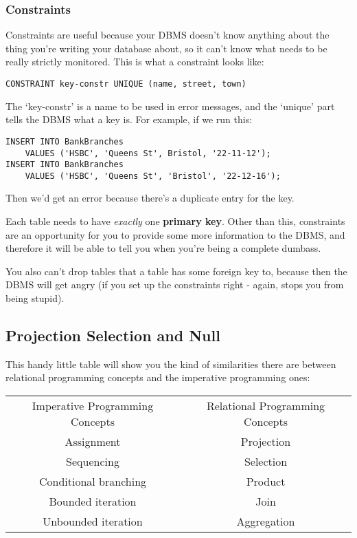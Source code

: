 \documentclass[11pt,a4paper,titlepage,dvipsnames,cmyk]{scrartcl}
\begin{document}
\subsubsection{Constraints}%
\label{ssub:Constraints}
Constraints are useful because your DBMS doesn't know anything about the
thing you're writing your database about, so it can't know what needs to
be really strictly monitored. This is what a constraint looks like:

\begin{lstlisting}[style=B]
CONSTRAINT key-constr UNIQUE (name, street, town)
\end{lstlisting}

The `key-constr' is a name to be used in error messages, and the `unique'
part tells the DBMS what a key is. For example, if we run this:

\begin{lstlisting}[style=B]
INSERT INTO BankBranches
    VALUES ('HSBC', 'Queens St', Bristol, '22-11-12');
INSERT INTO BankBranches
    VALUES ('HSBC', 'Queens St', 'Bristol', '22-12-16');
\end{lstlisting}

Then we'd get an error because there's a duplicate entry for the key.

Each table needs to have \textit{exactly} one \textbf{primary key}. Other
than this, constraints are an opportunity for you to provide some more
information to the DBMS, and therefore it will be able to tell you when
you're being a complete dumbass.

You also can't drop tables that a table has some foreign key to, because
then the DBMS will get angry (if you set up the constraints right - again,
stops you from being stupid).

\subsection{Projection Selection and Null}%
\label{sub:projection}
This handy little table will show you the kind of similarities there are
between relational programming concepts and the imperative programming
ones:

\begin{center}
    \begin{tabular}{c|c}
        Imperative Programming Concepts & Relational Programming Concepts
        \\
        \hhline{=|=}
        Assignment & Projection \\
        Sequencing & Selection \\
        Conditional branching & Product \\
        Bounded iteration & Join \\
        Unbounded iteration & Aggregation
    \end{tabular}
\end{center}
\end{document}
